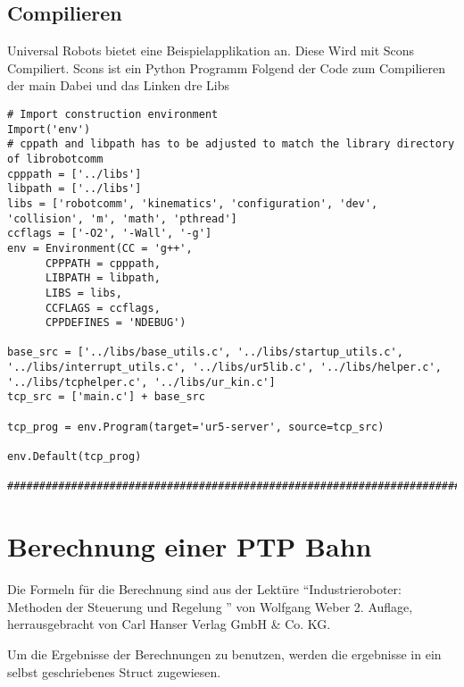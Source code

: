 \documentclass[
a4paper,
12pt,
oneside,
headsepline,		%
footsepline,		%
]{scrbook}
\begin{document}
\section{Compilieren}

Universal Robots bietet eine Beispielapplikation an. Diese Wird mit Scons Compiliert. Scons ist ein Python Programm
Folgend der Code zum Compilieren der main Dabei und das Linken dre Libs

\begin{lstlisting}
# Import construction environment
Import('env')
# cppath and libpath has to be adjusted to match the library directory of librobotcomm
cpppath = ['../libs']
libpath = ['../libs']
libs = ['robotcomm', 'kinematics', 'configuration', 'dev', 'collision', 'm', 'math', 'pthread']
ccflags = ['-O2', '-Wall', '-g']
env = Environment(CC = 'g++',
      CPPPATH = cpppath,
      LIBPATH = libpath,
      LIBS = libs,
      CCFLAGS = ccflags,
      CPPDEFINES = 'NDEBUG')

base_src = ['../libs/base_utils.c', '../libs/startup_utils.c', '../libs/interrupt_utils.c', '../libs/ur5lib.c', '../libs/helper.c', '../libs/tcphelper.c', '../libs/ur_kin.c']
tcp_src = ['main.c'] + base_src

tcp_prog = env.Program(target='ur5-server', source=tcp_src)

env.Default(tcp_prog)

###############################################################################
\end{lstlisting}

\chapter{Berechnung einer PTP Bahn}
\label{ptp_bahn}

Die Formeln für die Berechnung sind aus der Lektüre ``Industrieroboter: Methoden der Steuerung und Regelung '' von Wolfgang Weber 2. Auflage, herrausgebracht von  Carl Hanser Verlag GmbH \& Co. KG.

Um die Ergebnisse der Berechnungen zu benutzen, werden die ergebnisse in ein selbst geschriebenes Struct zugewiesen.
\end{document}
